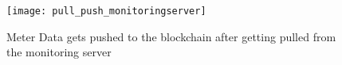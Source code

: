 \begin{figure}[ht!]
    \centering
    \texttt{[image: pull\_push\_monitoringserver]}
    \caption{Meter Data gets pushed to the blockchain after getting pulled from the monitoring server}
    \label{fig:pull_push_monitoringserver}
\end{figure}
